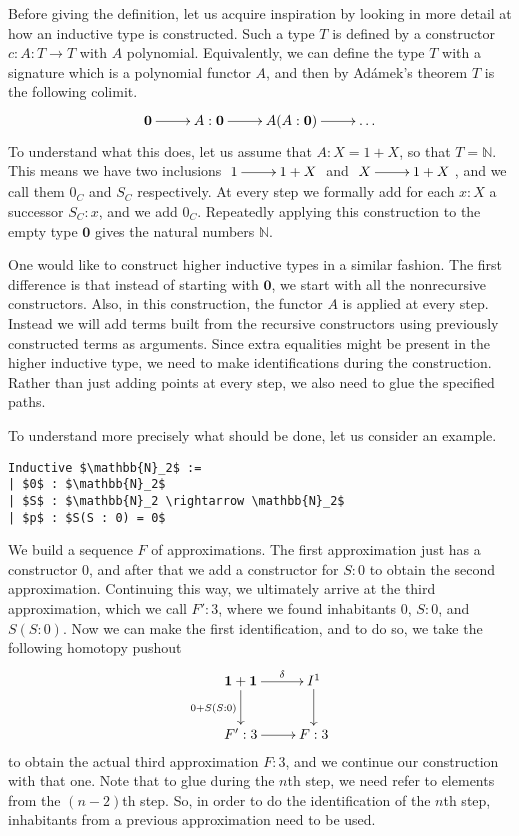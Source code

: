\documentclass[a4paper,UKenglish]{lipics-v2016}
\newcommand{\zero}[0]{\textbf{0}}
\newcommand{\one}[0]{\textbf{1}}
\begin{document}
Before giving the definition, let us acquire inspiration by looking in more detail at how an inductive type is constructed.
Such a type $T$ is defined by a constructor $c : A : T \rightarrow T$ with $A$ polynomial.
Equivalently, we can define the type $T$ with a signature which is a polynomial functor $A$, and then by Ad\'amek's theorem $T$ is the following colimit.
\[
\xymatrix
{
        \zero \ar[r] & A : \zero  \ar[r] & A(A : \zero) \ar[r] & \ldots
}
\]
To understand what this does, let us assume that $A : X = 1 + X$, so that $T = \mathbb{N}$.
This means we have two inclusions  $\xymatrix{1 \ar[r] & 1+X}$ and  $\xymatrix{X \ar[r] & 1+X}$, and we call them $0_C$ and $S_C$ respectively.
At every step we formally add for each $x : X$ a successor $S_C : x$, and we add $0_C$.
Repeatedly applying this construction to the empty type $\zero$ gives the natural numbers $\mathbb{N}$.

One would like to construct higher inductive types in a similar fashion.
The first difference is that instead of starting with $\zero$, we start with all the nonrecursive constructors.
Also, in this construction, the functor $A$ is applied at every step.
Instead we will add terms built from the recursive constructors using previously constructed terms as arguments.
Since extra equalities might be present in the higher inductive type, we need to make identifications during the construction.
Rather than just adding points at every step, we also need to glue the specified paths.

To understand more precisely what should be done, let us consider an example.
\lstset{language=Coq}
\begin{lstlisting}
Inductive $\mathbb{N}_2$ :=
| $0$ : $\mathbb{N}_2$
| $S$ : $\mathbb{N}_2 \rightarrow \mathbb{N}_2$
| $p$ : $S(S : 0) = 0$
\end{lstlisting}
We build a sequence $F$ of approximations.
The first approximation just has a constructor $0$, and after that we add a constructor for $S : 0$ to obtain the second approximation.
Continuing this way, we ultimately arrive at the third approximation, which we call $F' : 3$, where we found inhabitants $0$, $S : 0$, and $S(S : 0)$.
Now we can make the first identification, and to do so, we take the following homotopy pushout
\[
\xymatrix
{
        \one + \one \ar[d]_{0 + S(S : 0)} \ar[r]^-{\delta} & I^1 \ar[d]\\
        F' : 3\ar[r] & F : 3
}
\]
to obtain the actual third approximation $F : 3$, and we continue our construction with that one.
Note that to glue during the $n$th step, we need refer to elements from the $(n-2)$th step.
So, in order to do the identification of the $n$th step, inhabitants from a previous approximation need to be used.
\end{document}
